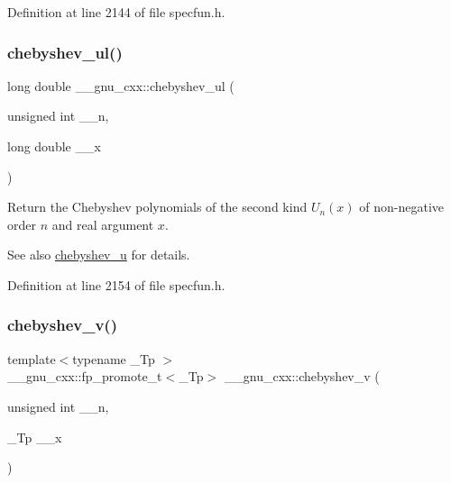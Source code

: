 Definition at line 2144 of file specfun.\+h.

\mbox{\label{group__gnu__math__spec__func_ga11ec202d6aacafba1182e962ecf02978}} 
\subsubsection{\texorpdfstring{chebyshev\+\_\+ul()}{chebyshev\_ul()}}
{\footnotesize\ttfamily long double \+\_\+\+\_\+gnu\+\_\+cxx\+::chebyshev\+\_\+ul (\begin{DoxyParamCaption}\item[{unsigned int}]{\+\_\+\+\_\+n,  }\item[{long double}]{\+\_\+\+\_\+x }\end{DoxyParamCaption})\hspace{0.3cm}{\ttfamily [inline]}}

Return the Chebyshev polynomials of the second kind $ U_n(x) $ of non-\/negative order $ n $ and real argument $ x $.

\begin{DoxySeeAlso}{See also}
\hyperlink{group__gnu__math__spec__func_gafa90c06bdedb8459f20576297cf1608f}{chebyshev\+\_\+u} for details. 
\end{DoxySeeAlso}


Definition at line 2154 of file specfun.\+h.

\mbox{\label{group__gnu__math__spec__func_ga32b7decd0002f542d2c9187c5f0846c6}} 
\subsubsection{\texorpdfstring{chebyshev\+\_\+v()}{chebyshev\_v()}}
{\footnotesize\ttfamily template$<$typename \+\_\+\+Tp $>$ \\
\+\_\+\+\_\+gnu\+\_\+cxx\+::fp\+\_\+promote\+\_\+t$<$\+\_\+\+Tp$>$ \+\_\+\+\_\+gnu\+\_\+cxx\+::chebyshev\+\_\+v (\begin{DoxyParamCaption}\item[{unsigned int}]{\+\_\+\+\_\+n,  }\item[{\+\_\+\+Tp}]{\+\_\+\+\_\+x }\end{DoxyParamCaption})\hspace{0.3cm}{\ttfamily [inline]}}

